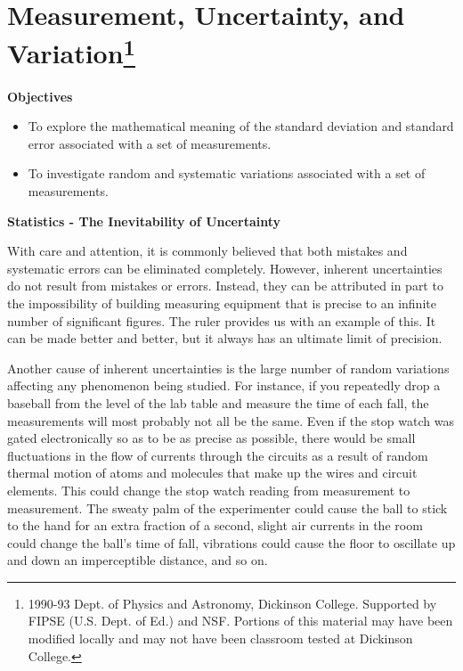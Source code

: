 \section{Measurement, Uncertainty, and Variation\footnote{
1990-93 Dept. of Physics and Astronomy, Dickinson College. Supported by FIPSE
(U.S. Dept. of Ed.) and NSF. Portions of this material may have been modified
locally and may not have been classroom tested at Dickinson College.
}}

\makelabheader %

\bigskip
\textbf{Objectives }

\begin{itemize}[nosep]
\item To explore the mathematical meaning of the standard deviation and standard error
associated with a set of measurements. 
\item To investigate random and systematic variations associated with a set of measurements.
\end{itemize}

\bigskip
\textbf{Statistics - The Inevitability of Uncertainty }

With care and attention, it is commonly believed that both mistakes and systematic
errors can be eliminated completely. However, inherent uncertainties do not
result from mistakes or errors. Instead, they can be attributed in part to the
impossibility of building measuring equipment that is precise to an infinite
number of significant figures. The ruler provides us with an example of this.
It can be made better and better, but it always has an ultimate limit of precision.

Another cause of inherent uncertainties is the large number of random variations
affecting any phenomenon being studied. For instance, if you repeatedly drop
a baseball from the level of the lab table and measure the time of each fall,
the measurements will most probably not all be the same. Even if the stop watch
was gated electronically so as to be as precise as possible, there would be
small fluctuations in the flow of currents through the circuits as a result
of random thermal motion of atoms and molecules that make up the wires and circuit
elements. This could change the stop watch reading from measurement to measurement.
The sweaty palm of the experimenter could cause the ball to stick to the hand
for an extra fraction of a second, slight air currents in the room could change
the ball's time of fall, vibrations could cause the floor to oscillate up and
down an imperceptible distance, and so on.

